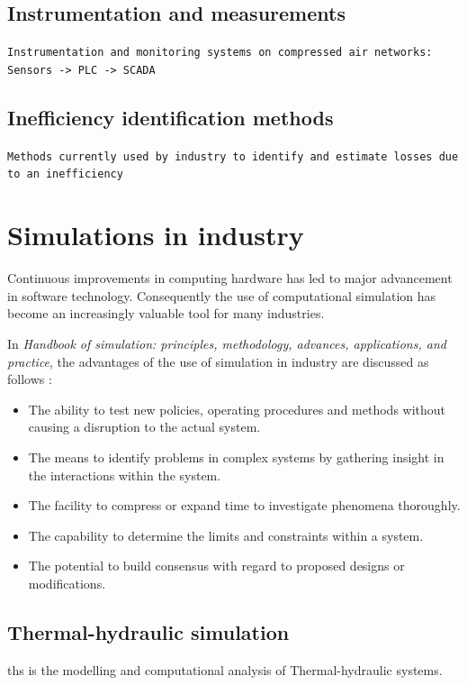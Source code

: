	\subsection{Instrumentation and measurements}
	\texttt{Instrumentation and monitoring systems on compressed air networks: Sensors -> PLC -> SCADA}
	\subsection{Inefficiency identification methods}
	\texttt{Methods currently used by industry to identify and estimate losses due to an inefficiency}
	
	
\section{Simulations in industry}

Continuous improvements in computing hardware has led to major advancement in software technology. Consequently the use of computational simulation has become an increasingly valuable tool for many industries.\cite{kocsis2003integration} \par 

 In \textit{ Handbook of simulation: principles, methodology, advances, applications, and practice}, the advantages of the use of simulation in industry are discussed as follows \cite{banks1998handbook}: 
\begin{itemize}
	\item The ability to test new policies, operating procedures and methods without causing a disruption to the actual system.
	\item The means to identify problems in complex systems by gathering insight in the interactions within the system.
	\item The facility to compress or expand time to investigate phenomena thoroughly.
	\item The capability to determine the limits and constraints within a system.
	\item The potential to build consensus with regard to proposed designs or modifications.
\end{itemize}

\subsection{Thermal-hydraulic simulation}
\gls{ths} is the modelling and computational analysis of Thermal-hydraulic systems.
